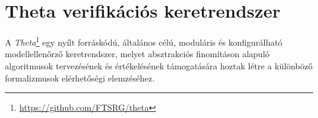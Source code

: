 \chapter{Theta verifikációs keretrendszer}

A \emph{Theta}\footnote{\url{https://github.com/FTSRG/theta}} egy nyílt forráskódú, általános célú, moduláris és konfigurálható modellellenőrző keretrendszer, melyet absztrakciós finomításon alapuló algoritmusok tervezésének és értékelésének támogatására hoztak létre a különböző formalizmusok elérhetőségi elemzéséhez.